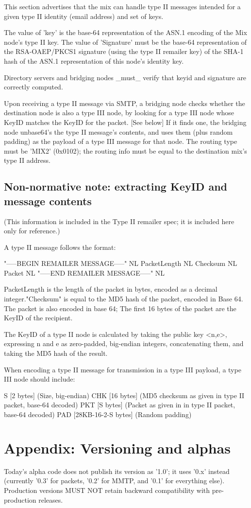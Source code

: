 This section advertises that the mix can handle type II messages
intended for a given type II identity (email address) and set of keys.

The value of 'key' is the base-64 representation of the ASN.1 encoding
of the Mix node's type II key. The value of 'Signature' must be the
base-64 representation of the RSA-OAEP/PKCS1 signature (using the
type II remailer key) of the SHA-1 hash of the ASN.1 representation of
this node's identity key.

Directory servers and bridging nodes _must_ verify that keyid and
signature are correctly computed.

Upon receiving a type II message via SMTP, a bridging node checks
whether the destination node is also a type III node, by looking for a
type III node whose KeyID matches the KeyID for the packet. [See below]
If it finds one, the bridging node unbase64's the type II message's 
contents, and uses them (plus random padding) as the payload
of a type III message for that node.  The routing type must be 'MIX2'
(0x0102); the routing info must be equal to the destination mix's
type II address.

\subsection{Non-normative note: extracting KeyID and message contents}

(This information is included in the Type II remailer spec; it is included
here only for reference.)

A type II message follows the format:

"-----BEGIN REMAILER MESSAGE-----" NL
PacketLength NL
Checksum NL
Packet NL
"-----END REMAILER MESSAGE-----" NL

PacketLength is the length of the packet in bytes, encoded as a
decimal integer."Checksum" is equal to the MD5 hash of the packet,
encoded in Base 64.  The packet is also encoded in base 64; The first
16 bytes of the packet are the KeyID of the recipient.

The KeyID of a type II node is calculated by taking the public key
<n,e>, expressing n and e as zero-padded, big-endian integers,
concatenating them, and taking the MD5 hash of the result.

When encoding a type II message for transmission in a type III payload,
a type III node should include:

S   [2 bytes] (Size, big-endian)
CHK [16 bytes] (MD5 checksum as given in type II packet, base-64 decoded)
PKT [S bytes] (Packet as given in in type II packet, base-64 decoded)
PAD [28KB-16-2-S bytes] (Random padding)

\section{Appendix: Versioning and alphas}

Today's alpha code does not publish its version as '1.0'; it uses
'0.x' instead (currently '0.3' for packets, '0.2' for MMTP, and '0.1'
for everything else).  Production versions MUST NOT retain
backward compatibility with pre-production releases.

